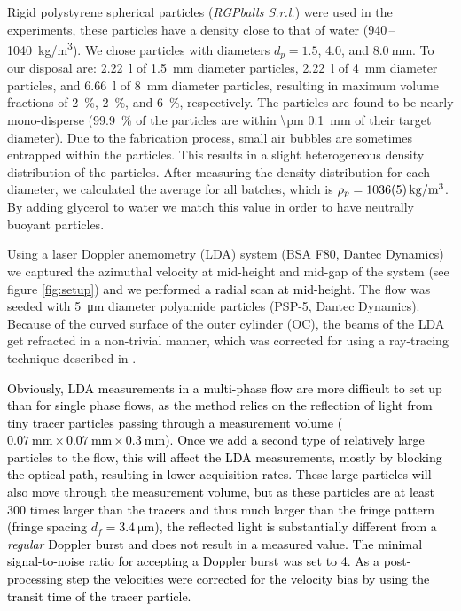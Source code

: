 \documentclass{jfm}
\newcommand{\red}[1]{\textcolor{black}{#1}}
\begin{document}
Rigid polystyrene spherical particles (\textit{RGPballs S.r.l.}) were used in
the experiments, these particles have a density close to that of water
(940\,--\SI{1040}{\kilo\gram/\metre\cubed}). We chose particles with diameters
$d_p = 1.5$, 4.0, and $\SI{8.0}{\milli\metre}$. To our disposal are:
\SI{2.22}{\litre} of \SI{1.5}{\milli\metre} diameter particles,
\SI{2.22}{\litre} of \SI{4}{\milli\metre} diameter particles, and
\SI{6.66}{\litre} of \SI{8}{\milli\metre} diameter particles, resulting in
maximum volume fractions of \SI{2}{\percent}, \SI{2}{\percent}, and
\SI{6}{\percent}, respectively. The particles are found to be nearly
mono-disperse (\SI{99.9}{\percent} of the particles are within \SI{\pm
0.1}{\milli\metre} of their target diameter). Due to the fabrication process,
small air bubbles are sometimes entrapped within the particles. This results
in a slight heterogeneous density distribution of the particles. After
measuring the density distribution for each diameter, we calculated the
average for all batches, which is $\rho_p = \SI{1036 \pm
5}{\kilo\gram/\metre\cubed}$. By adding glycerol to water we match this value
in order to have neutrally buoyant particles.

Using a laser Doppler anemometry (LDA) system (BSA F80, Dantec Dynamics) we
captured the azimuthal velocity at mid-height and mid-gap of the system (see
figure \ref{fig:setup}) \red{and we performed a radial scan at mid-height}.
The flow was seeded with \SI{5}{\micro\metre} diameter polyamide particles
(PSP-5, Dantec Dynamics). Because of the curved surface of the outer cylinder
(OC), the beams of the LDA get refracted in a non-trivial manner, which was
corrected for using a ray-tracing technique described in \cite{Huisman2012}. 

\red{
Obviously, LDA measurements in a multi-phase flow are more difficult to set up
than for single phase flows, as the method relies on the reflection of
light from tiny tracer particles passing through a measurement volume
($\SI{0.07}{\milli\metre} \times \SI{0.07}{\milli\metre} \times
\SI{0.3}{\milli\metre}$).  Once we add a second type of relatively large
particles to the flow, this will affect the LDA measurements, mostly by
blocking the optical path, resulting in lower acquisition rates. These large
particles will also move through the measurement volume, but as these
particles are at least 300 times larger than the tracers and thus much larger
than the fringe pattern (fringe spacing $d_f=\SI{3.4}{\micro\metre}$), the
reflected light is substantially different from a \emph{regular} Doppler burst
and does not result in a measured value. The minimal signal-to-noise ratio for
accepting a Doppler burst was set to 4. As a post-processing step the
velocities were corrected for the velocity bias by using the transit time of
the tracer particle.  }
\end{document}
